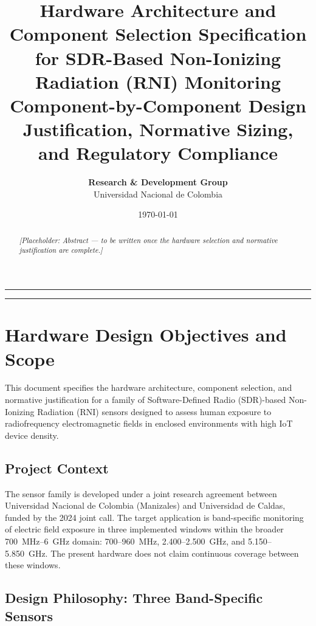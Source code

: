 \documentclass[11pt,a4paper]{article}
\title{\textbf{\LARGE\color{primary} Hardware Architecture and Component Selection Specification \\ for SDR-Based Non-Ionizing Radiation (RNI) Monitoring} \\[0.5em]
\large\color{secondary} Component-by-Component Design Justification, Normative Sizing, and Regulatory Compliance}
\author{\textbf{Research \& Development Group} \\
Universidad Nacional de Colombia}
\date{\today}
\begin{document}
\maketitle
\thispagestyle{plain}

\begin{abstract}
\noindent \textit{[Placeholder: Abstract --- to be written once the hardware selection and normative justification are complete.]}
\end{abstract}

\vspace{1em}
\hrule
\vspace{1em}

\tableofcontents
\vspace{1.5em}
\hrule
\newpage

\section{Hardware Design Objectives and Scope}
\label{sec:design_objectives}

This document specifies the hardware architecture, component selection, and normative justification for a family of Software-Defined Radio (SDR)-based Non-Ionizing Radiation (RNI) sensors designed to assess human exposure to radiofrequency electromagnetic fields in enclosed environments with high IoT device density.

\subsection{Project Context}

The sensor family is developed under a joint research agreement between Universidad Nacional de Colombia (Manizales) and Universidad de Caldas, funded by the 2024 joint call. The target application is band-specific monitoring of electric field exposure in three implemented windows within the broader 700~MHz--6~GHz domain: 700--960~MHz, 2.400--2.500~GHz, and 5.150--5.850~GHz. The present hardware does not claim continuous coverage between these windows.

\subsection{Design Philosophy: Three Band-Specific Sensors}
\end{document}

